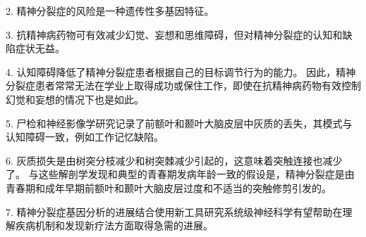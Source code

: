 2. 精神分裂症的风险是一种遗传性多基因特征。


3. 抗精神病药物可有效减少幻觉、妄想和思维障碍，但对精神分裂症的认知和缺陷症状无益。


4. 认知障碍降低了精神分裂症患者根据自己的目标调节行为的能力。
因此，精神分裂症患者常常无法在学业上取得成功或保住工作，即使在抗精神病药物有效控制幻觉和妄想的情况下也是如此。


5. 尸检和神经影像学研究记录了前额叶和颞叶大脑皮层中灰质的丢失，其模式与认知障碍一致，例如工作记忆缺陷。


6. 灰质损失是由树突分枝减少和树突棘减少引起的，这意味着突触连接也减少了。
与这些解剖学发现和典型的青春期发病年龄一致的假设是，精神分裂症是由青春期和成年早期前额叶和颞叶大脑皮层过度和不适当的突触修剪引发的。


7. 精神分裂症基因分析的进展结合使用新工具研究系统级神经科学有望帮助在理解疾病机制和发现新疗法方面取得急需的进展。



